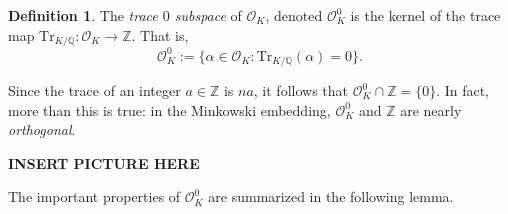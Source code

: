 \documentclass[12pt]{amsart}
\theoremstyle{definition} \newtheorem*{notation}{Notation}
\theoremstyle{remark} \newtheorem*{remark}{Remark}
\theoremstyle{remark} \newtheorem*{example}{Example}
\theoremstyle{definition} \newtheorem*{definition}{Definition}
\theoremstyle{definition} \newtheorem*{question}{Question}
\numberwithin{equation}{section}
\numberwithin{theorem}{section}
\begin{document}
	\begin{definition}
		The \emph{trace $0$ subspace} of $\mathcal{O}_K$, denoted $\mathcal{O}_K^0$ is the kernel of the trace map $\mathrm{Tr}_{K/\mathbb{Q}} \colon \mathcal{O}_K \to \mathbb{Z}$.  That is,	
			\[
				\mathcal{O}_K^0 := \{ \alpha \in \mathcal{O}_K : \mathrm{Tr}_{K/\mathbb{Q}}(\alpha) = 0\}.
			\]
	\end{definition}
	
	Since the trace of an integer $a \in \mathbb{Z}$ is $na$, it follows that $\mathcal{O}_K^0 \cap \mathbb{Z} = \{0\}$.  In fact, more than this is true: in the Minkowski embedding, $\mathcal{O}_K^0$ and $\mathbb{Z}$ are nearly \emph{orthogonal}.
	
	\begin{center}
	{\bf INSERT PICTURE HERE}
	\end{center}
	
	
	The important properties of $\mathcal{O}_K^0$ are summarized in the following lemma.
	
\end{document}

